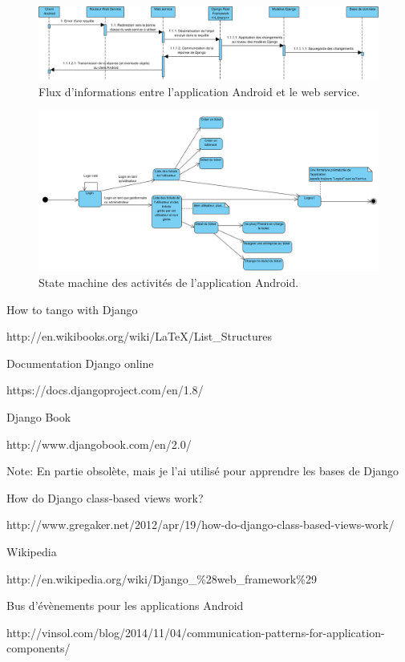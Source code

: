 \documentclass[12pt,table,a4paper]{report}
\begin{document}
\begin{figure}
\centering
\includegraphics{images/schemas/communication-django-webservice-android.png}
\caption{Flux d'informations entre l'application Android et le web service.}
\label{fig:dataflow-android-webservice}
\end{figure}

\begin{figure}
\centering
\includegraphics{images/schemas/state_machine_activites_android.PNG}
\caption{State machine des activités de l'application Android.}
\label{fig:flow-application-android}
\end{figure}

\begin{thebibliography}{breitestes Label}
	    How to tango with Django
	    
	    http://en.wikibooks.org/wiki/LaTeX/List\_Structures
	
		Documentation Django online
		
		https://docs.djangoproject.com/en/1.8/
	
	    Django Book
	    
	    http://www.djangobook.com/en/2.0/
	    
	    Note: En partie obsolète, mais je l'ai utilisé pour apprendre les bases de Django
	    
			How do Django class-based views work?
			
			http://www.gregaker.net/2012/apr/19/how-do-django-class-based-views-work/
			
			Wikipedia
			
			http://en.wikipedia.org/wiki/Django\_\%28web\_framework\%29
			
	Bus d'évènements pour les applications Android
	
	http://vinsol.com/blog/2014/11/04/communication-patterns-for-application-components/
\end{thebibliography}
\end{document}

